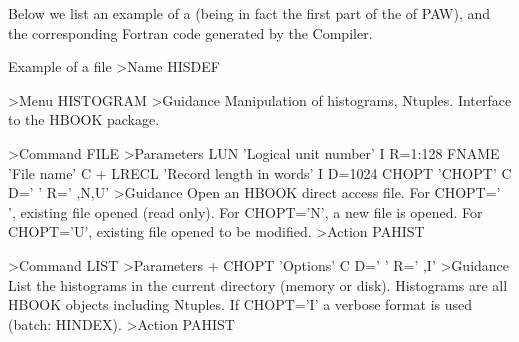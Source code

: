 Below we list an example of a \CDF{} (being in fact the first part of the \CDF{} of PAW),
and the corresponding Fortran code generated by the \KUIP{} Compiler.
%
%
\begin{XMPtext}{Example of a \CDF{} file}
>Name HISDEF
 
>Menu HISTOGRAM
>Guidance
Manipulation of histograms, Ntuples.
Interface to the HBOOK package.
 
>Command FILE
>Parameters
LUN 'Logical unit number' I R=1:128
FNAME 'File name' C
+
LRECL 'Record length in words' I D=1024
CHOPT 'CHOPT' C D=' ' R=' ,N,U'
>Guidance
Open an HBOOK direct access file.
 For CHOPT=' ', existing file opened (read only).
 For CHOPT='N', a new file is opened.
 For CHOPT='U', existing file opened to be modified.
>Action PAHIST
 
>Command LIST
>Parameters
+
CHOPT 'Options' C D=' ' R=' ,I'
>Guidance
List the histograms in the current directory (memory or disk).
Histograms are all HBOOK objects including Ntuples.
If CHOPT='I' a verbose format is used (batch: HINDEX).
>Action PAHIST
\end{XMPtext}
\newpage
